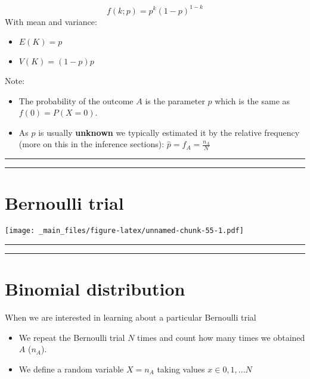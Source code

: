 \documentclass[
]{book}
\begin{document}
\[f(k; p)=p^k(1-p)^{1-k} \]
With mean and variance:

\begin{itemize}
\item
  \(E(K)=p\)
\item
  \(V(K)=(1-p)p\)
\end{itemize}

Note:

\begin{itemize}
\item
  The probability of the outcome \(A\) is the parameter \(p\)
  which is the same as \(f(0)=P(X=0)\).
\item
  As \(p\) is usually \textbf{unknown} we typically estimated it by the relative frequency (more on this in the inference sections): \(\hat{p}=f_A=\frac{n_A}{N}\)
\end{itemize}

\begin{center}\rule{0.5\linewidth}{0.5pt}\end{center}

\begin{center}\rule{0.5\linewidth}{0.5pt}\end{center}

\hypertarget{bernoulli-trial-3}{%
\section{Bernoulli trial}\label{bernoulli-trial-3}}

\texttt{[image: \_main\_files/figure-latex/unnamed-chunk-55-1.pdf]}

\begin{center}\rule{0.5\linewidth}{0.5pt}\end{center}

\begin{center}\rule{0.5\linewidth}{0.5pt}\end{center}

\hypertarget{binomial-distribution}{%
\section{Binomial distribution}\label{binomial-distribution}}

When we are interested in learning about a particular Bernoulli trial

\begin{itemize}
\item
  We repeat the Bernoulli trial \(N\) times and count how many times we obtained \(A\) (\(n_A\)).
\item
  We define a random variable \(X=n_A\) taking values \(x \in {0,1,...N}\)
\end{itemize}
\end{document}
